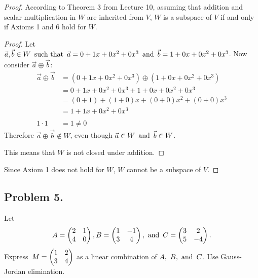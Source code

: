 \begin{proof}
  According to Theorem 3 from Lecture 10, assuming that addition and scalar multiplication in $W$ are inherited from $V$, $W$ is a subspace of $V$ if and only if Axioms 1 and 6 hold for $W$.
  \begin{enumerate}
    \begin{proof}
      Let $\vec{a}, \vec{b} \in W \operatorname{~\text{such that}~} \vec{a} = 0 + 1x + 0x^2 + 0x^3 \operatorname{~\text{and}~} \vec{b} = 1 + 0x + 0x^2 + 0x^3$. Now consider $\vec{a} \oplus \vec{b}$:
      \begin{align*}
        \vec{a} \oplus \vec{b} & = (0 + 1x + 0x^2 + 0x^3) \oplus (1 + 0x + 0x^2 + 0x^3) \\
                               & = 0 + 1x + 0x^2 + 0x^3 + 1 + 0x + 0x^2 + 0x^3          \\
                               & = (0+1) + (1+0)x + (0+0)x^2 + (0+0)x^3                 \\
                               & = 1 + 1x + 0x^2 + 0x^3                                 \\ \\
        1 \cdot 1              & = 1 \neq 0
      \end{align*}
      Therefore $\vec{a} \oplus \vec{b} \not \in W$, even though $\vec{a} \in W \operatorname{~\text{and}~} \vec{b} \in W$.

      This means that $W$ is not closed under addition.
    \end{proof}
  \end{enumerate}
  Since Axiom 1 does not hold for $W$, $W$ cannot be a subspace of $V$.
\end{proof}

\newpage

\subsection*{Problem 5.}
Let
\[
  A = \begin{pmatrix}2 & 1 \\ 4 & 0\end{pmatrix}, B = \begin{pmatrix}1 & -1 \\ 3 & 4\end{pmatrix}, \operatorname{~\text{and}~} C = \begin{pmatrix}3 & 2  \\ 5 & -4\end{pmatrix}.
\]
Express $\operatorname{\displaystyle} M = \begin{pmatrix}1 & 2 \\ 3 & 4\end{pmatrix}$ as a linear combination of $A,~B,\operatorname{~\text{and}~} C$. Use Gauss-Jordan elimination.

